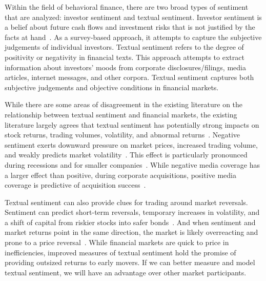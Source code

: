 
Within the field of behavioral finance, there are two broad types of sentiment that are analyzed: investor sentiment and textual sentiment.
Investor sentiment is a belief about future cash flows and investment risks that is not justified by the facts at hand~\citep{BakerMalcolm2007ISit}.
As a survey-based approach, it attempts to capture the subjective judgements of individual investors.
Textual sentiment refers to the degree of positivity or negativity in financial texts.
This approach attempts to extract information about investors’ moods from corporate disclosures/filings, media articles, internet messages, and other corpora.
Textual sentiment captures both subjective judgements and objective conditions in financial markets.



While there are some areas of disagreement in the existing literature on the relationship between textual sentiment and financial markets, the existing literature largely agrees that textual sentiment has potentially strong impacts on stock returns, trading volumes, volatility, and abnormal returns~\citep{KearneyColm2014Tsif}.
Negative sentiment exerts downward pressure on market prices, increased trading volume, and weakly predicts market volatility~\citep{TetlockPaul2007GCtI}.
This effect is particularly pronounced during recessions \citep{garciadiego2013SdR} and for smaller companies~\citep{FergusonNickyJ2015MCaS}.
While negative media coverage has a larger effect than positive, during corporate acquisitions, positive media coverage is predictive of acquisition success~\citep{buehlmaier2015role}.

Textual sentiment can also provide clues for trading around market reversals.
Sentiment can predict short-term reversals, temporary increases in volatility, and a shift of capital from riskier stocks into safer bonds~\citep{DaZhi2015TSoA}.
And when sentiment and market returns point in the same direction, the market is likely overreacting and prone to a price reversal~\citep{froot2017media}.
While financial markets are quick to price in inefficiencies, improved measures of textual sentiment hold the promise of providing outsized returns to early movers.
If we can better measure and model textual sentiment, we will have an advantage over other market participants.

